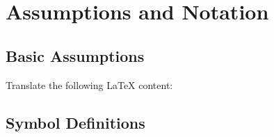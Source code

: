\section{Assumptions and Notation}\subsection{Basic Assumptions}Translate the following LaTeX content:\subsection{Symbol Definitions}
